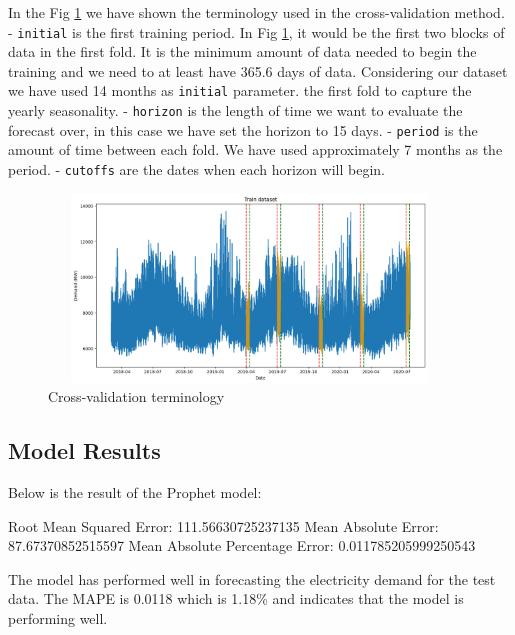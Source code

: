 \documentclass[mstat,12pt]{unswthesis}
\newenvironment{Shaded}{\begin{snugshade}}{\end{snugshade}}
\newcommand{\FloatTok}[1]{\textcolor[rgb]{0.00,0.00,0.81}{#1}}
\newcommand{\NormalTok}[1]{#1}
\begin{document}
In the Fig \ref{cross_validation_output} we have shown the terminology
used in the cross-validation method. - \texttt{initial} is the first
training period. In Fig \ref{cross_validation_output}, it would be the
first two blocks of data in the first fold. It is the minimum amount of
data needed to begin the training and we need to at least have 365.6
days of data. Considering our dataset we have used 14 months as
\texttt{initial} parameter. the first fold to capture the yearly
seasonality. - \texttt{horizon} is the length of time we want to
evaluate the forecast over, in this case we have set the horizon to 15
days. - \texttt{period} is the amount of time between each fold. We have
used approximately 7 months as the period. - \texttt{cutoffs} are the
dates when each horizon will begin.

\begin{figure}[H]
\centering
\includegraphics[width=0.95\textwidth, height=5cm]{cross_validation_output.png}
\caption{Cross-validation terminology}\label{cross_validation_output}
\end{figure}

\subsection{Model Results}\label{model-results-1}

Below is the result of the Prophet model:

\begin{Shaded}
\begin{Highlighting}[]
\NormalTok{Root Mean Squared Error: }\FloatTok{111.56630725237135}
\NormalTok{Mean Absolute Error: }\FloatTok{87.67370852515597}
\NormalTok{Mean Absolute Percentage Error: }\FloatTok{0.011785205999250543}
\end{Highlighting}
\end{Shaded}

The model has performed well in forecasting the electricity demand for
the test data. The MAPE is 0.0118 which is 1.18\% and indicates that the
model is performing well.
\end{document}
